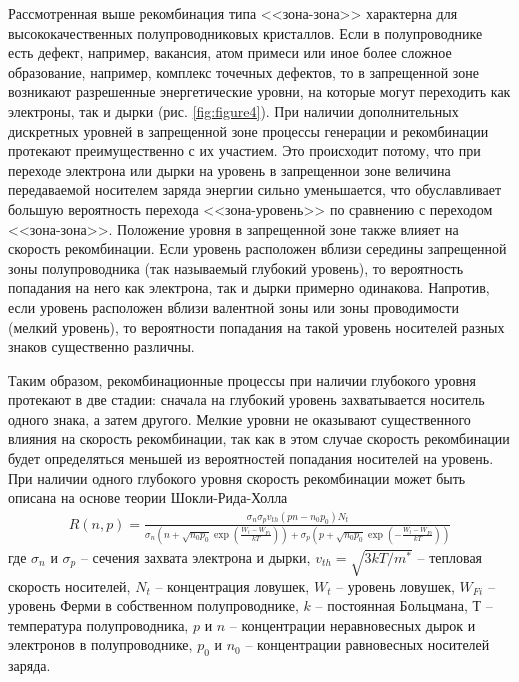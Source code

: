 \documentclass[a4paper,12pt]{article}
\begin{document}
Рассмотренная выше рекомбинация типа <<зона-зона>> характерна для высококачественных полупроводниковых кристаллов. Если в полупроводнике есть дефект, например, вакансия, атом примеси или иное более сложное образование, например, комплекс точечных дефектов, то в запрещенной зоне возникают разрешенные энергетические уровни, на которые могут переходить как электроны, так и дырки (рис. \ref{fig:figure4}). При наличии дополнительных дискретных уровней в запрещенной зоне процессы генерации и рекомбинации протекают преимущественно с их участием. Это происходит потому, что при переходе электрона или дырки на уровень в запрещеннои зоне величина передаваемой носителем заряда энергии сильно уменьшается, что обуславливает большую вероятность перехода <<зона-уровень>> по сравнению с переходом <<зона-зона>>. Положение уровня в запрещенной зоне также влияет на скорость рекомбинации. Если уровень расположен вблизи середины запрещенной зоны полупроводника (так называемый глубокий уровень), то вероятность попадания на него как электрона, так и дырки примерно одинакова. Напротив, если уровень расположен вблизи валентной зоны или зоны проводимости (мелкий уровень), то вероятности попадания на такой уровень носителей разных знаков существенно различны.

Таким образом, рекомбинационные процессы при наличии глубокого уровня протекают в две стадии: сначала на глубокий уровень захватывается носитель одного знака, а затем другого. Мелкие уровни не оказывают существенного влияния на скорость рекомбинации, так как в этом случае скорость рекомбинации будет определяться меньшей из вероятностей попадания носителей на уровень. При наличии одного глубокого уровня скорость рекомбинации может быть описана на основе теории Шокли-Рида-Холла
\begin{gather}
	\label{eq4}
	R(n, p)=\frac{\sigma_{n} \sigma_{p} v_{t h}\left(p n-n_{0} p_{0}\right) N_{t}}{\sigma_{n}\left(n+\sqrt{n_{0} p_{0}} \exp \left(\frac{W_{t}-W_{F i}}{k T}\right)\right)+\sigma_{p}\left(p+\sqrt{n_{0} p_{0}} \exp \left(-\frac{W_{t}-W_{F i}}{k T}\right)\right)}
\end{gather}
где $\sigma_{n}$ и $\sigma_{p}$ -- сечения захвата электрона и дырки, $v_{th}=\sqrt{3kT/m^*}$ -- тепловая скорость носителей, $N_t$ -- концентрация ловушек, $W_t$ -- уровень ловушек, $W_{Fi}$ -- уровень Ферми в собственном полупроводнике, $k$ -- постоянная Больцмана, $Т$ -- температура полупроводника, $p$ и $n$ -- концентрации неравновесных дырок и электронов в полупроводнике, $p_0$ и $n_0$ -- концентрации равновесных носителей заряда.
\end{document}
